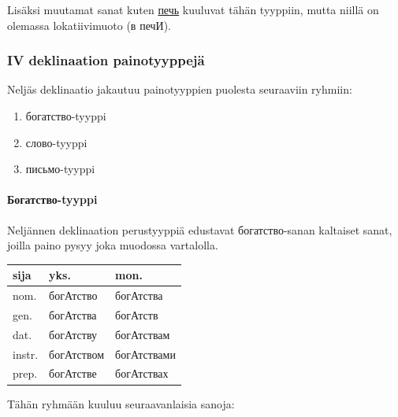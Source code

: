 \documentclass[]{scrartcl}
\providecommand{\tightlist}{%
  \setlength{\itemsep}{0pt}\setlength{\parskip}{0pt}}
\begin{document}
Lisäksi muutamat sanat kuten
\href{http://ru.wiktionary.org/wiki/печь}{печь} kuuluvat tähän tyyppiin,
mutta niillä on olemassa lokatiivimuoto (в печИ).

\subsubsection{IV deklinaation
painotyyppejä}\label{iv-deklinaation-painotyyppejuxe4}

Neljäs deklinaatio jakautuu painotyyppien puolesta seuraaviin ryhmiin:

\begin{enumerate}
\def\labelenumi{\arabic{enumi}.}
\tightlist
\item
  богатство-tyyppi
\item
  слово-tyyppi
\item
  письмо-tyyppi
\end{enumerate}

\paragraph{Богатство-tyyppi}\label{ux431ux43eux433ux430ux442ux441ux442ux432ux43e-tyyppi}

Neljännen deklinaation perustyyppiä edustavat богатство-sanan kaltaiset
sanat, joilla paino pysyy joka muodossa vartalolla.

\begin{longtable}[c]{@{}lll@{}}
\toprule
sija & yks. & mon.\tabularnewline
\midrule
\endhead
nom. & богАтство & богАтства\tabularnewline
gen. & богАтства & богАтств\tabularnewline
dat. & богАтству & богАтствам\tabularnewline
instr. & богАтством & богАтствами\tabularnewline
prep. & богАтстве & богАтствах\tabularnewline
\bottomrule
\end{longtable}

Tähän ryhmään kuuluu seuraavanlaisia sanoja:
\end{document}
